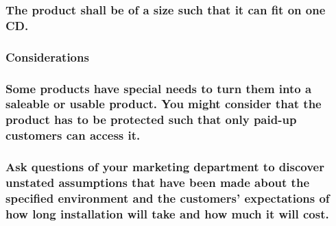 \documentclass[
]{article}
\begin{document}
\hypertarget{the-product-shall-be-of-a-size-such-that-it-can-fit-on-one-cd.}{%
\subsubsection{The product shall be of a size such that it can fit on
one
CD.}\label{the-product-shall-be-of-a-size-such-that-it-can-fit-on-one-cd.}}

\hypertarget{considerations-31}{%
\subsubsection{Considerations}\label{considerations-31}}

\hypertarget{some-products-have-special-needs-to-turn-them-into-a-saleable-or-usable-product.-you-might-consider-that-the-product-has-to-be-protected-such-that-only-paid-up-customers-can-access-it.}{%
\subsubsection{\texorpdfstring{Some products have special needs to turn
them into a saleable or usable product. You might consider that the
product has to be protected such that only paid-up customers can access
it.
}{Some products have special needs to turn them into a saleable or usable product. You might consider that the product has to be protected such that only paid-up customers can access it. }}\label{some-products-have-special-needs-to-turn-them-into-a-saleable-or-usable-product.-you-might-consider-that-the-product-has-to-be-protected-such-that-only-paid-up-customers-can-access-it.}}

\hypertarget{ask-questions-of-your-marketing-department-to-discover-unstated-assumptions-that-have-been-made-about-the-specified-environment-and-the-customers-expectations-of-how-long-installation-will-take-and-how-much-it-will-cost.}{%
\subsubsection{Ask questions of your marketing department to discover
unstated assumptions that have been made about the specified environment
and the customers' expectations of how long installation will take and
how much it will
cost.}\label{ask-questions-of-your-marketing-department-to-discover-unstated-assumptions-that-have-been-made-about-the-specified-environment-and-the-customers-expectations-of-how-long-installation-will-take-and-how-much-it-will-cost.}}
\end{document}
